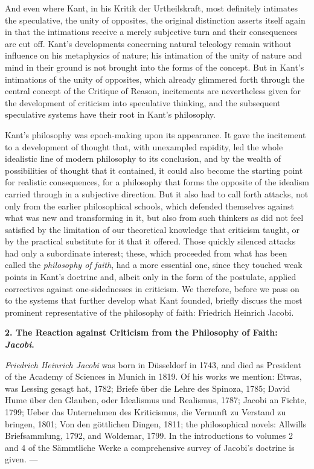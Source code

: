 And even where Kant, in his Kritik der Urtheilskraft, most definitely
intimates the speculative, the unity of opposites, the original
distinction asserts itself again in that the intimations receive a
merely subjective turn and their consequences are cut off. Kant's
developments concerning natural teleology remain without influence on
his metaphysics of nature; his intimation of the unity of nature and
mind in their ground is not brought into the forms of the concept. But
in Kant's intimations of the unity of opposites, which already
glimmered forth through the central concept of the Critique of Reason,
incitements are nevertheless given for the development of criticism
into speculative thinking, and the subsequent speculative systems have
their root in Kant's philosophy.

\divrule

Kant's philosophy was epoch-making upon its appearance. It gave the
incitement to a development of thought that, with unexampled rapidity,
led the whole idealistic line of modern philosophy to its conclusion,
and by the wealth of possibilities of thought that it contained, it
could also become the starting point for realistic consequences, for a
philosophy that forms the opposite of the idealism carried through in a
subjective direction. But it also had to call forth attacks, not only
from the earlier philosophical schools, which defended themselves
against what was new and transforming in it, but also from such
thinkers as did not feel satisfied by the limitation of our theoretical
knowledge that criticism taught, or by the practical substitute for it
that it offered. Those quickly silenced attacks had only a
subordinate interest; these, which proceeded from what has been called
the \emph{philosophy of faith}, had a more essential one, since they
touched weak points in Kant's doctrine and, albeit only in the form of
the postulate, applied correctives against one-sidednesses in
criticism. We therefore, before we pass on to the systems that further
develop what Kant founded, briefly discuss the most prominent
representative of the philosophy of faith: Friedrich Heinrich Jacobi.

\divrule

\begin{center}
  \textbf{2. The Reaction against Criticism from the Philosophy of Faith: \emph{Jacobi}.}
\end{center}

\emph{Friedrich Heinrich Jacobi} was born in Düsseldorf in 1743, and
died as President of the Academy of Sciences in Munich in 1819. Of his
works we mention: Etwas, was Lessing gesagt hat, 1782; Briefe über die
Lehre des Spinoza, 1785; David Hume über den Glauben, oder Idealismus
und Realismus, 1787; Jacobi an Fichte, 1799; Ueber das Unternehmen des
Kriticismus, die Vernunft zu Verstand zu bringen, 1801; Von den
göttlichen Dingen, 1811; the philosophical novels: Allwills
Briefsammlung, 1792, and Woldemar, 1799. In the introductions to
volumes 2 and 4 of the Sämmtliche Werke a comprehensive survey of
Jacobi's doctrine is given. ---

